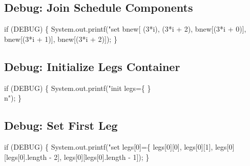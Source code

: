 \subsection{Debug: Join Schedule Components}

\nwenddocs{}\endmoddef\nwstartdeflinemarkup{}\nwenddeflinemarkup
if (DEBUG) \{
  System.out.printf("set bnew[%
      (3*i), (3*i + 2), bnew[(3*i + 0)], bnew[(3*i + 1)], bnew[(3*i + 2)]);
\}
\nwendcode{}\nwdocspar

\subsection{Debug: Initialize Legs Container}

\nwenddocs{}\endmoddef\nwstartdeflinemarkup{}\nwenddeflinemarkup
if (DEBUG) \{
  System.out.printf("init legs=\{ \}\\n");
\}
\nwendcode{}\nwdocspar

\subsection{Debug: Set First Leg}

\nwenddocs{}\endmoddef\nwstartdeflinemarkup{}\nwenddeflinemarkup
if (DEBUG) \{
  System.out.printf("set legs[0]=\{ %
      legs[0][0], legs[0][1], legs[0][legs[0].length - 2], legs[0][legs[0].length - 1]);
\}
\nwendcode{}\nwdocspar

